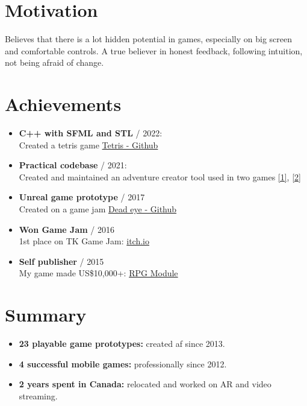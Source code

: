 \documentclass[12pt,a4paper]{article}
\begin{document}
\begin{multicols}{2}
\centering

\section*{ Motivation}
\justifying
Believes that there is a lot hidden potential in games, especially on big screen and comfortable controls. A true believer in honest feedback, following intuition, not being afraid of change.

\centering

\section*{Achievements}
\begin{itemize}[leftmargin=*]
	\setlength\itemsep{0.0cm}
	\item \textbf{C++ with SFML and STL} / 2022: \\
		Created a tetris game {\href{https://github.com/kbobnis/tetris}{Tetris - Github}}
	\item \textbf{Practical codebase} / 2021: \\
		Created and maintained an adventure creator tool used in two games {\href{https://play.google.com/store/apps/details?id=games.dali.adventure.neighborhood.unholy}{[1]}}, {\href{https://play.google.com/store/apps/details?id=games.dali.adventure.reborn}{[2]}}
	\item \textbf{Unreal game prototype} / 2017  \\
		 Created on a game jam  {\href{https://github.com/kbobnis/2017.05-TSG-Compo---Dead-eye}{Dead eye - Github}}
	\item \textbf{Won Game Jam} / 2016   \\
		1st place on TK Game Jam: {\href{https://itch.io/jam/tk-game-jam-2016/results}{itch.io}} 
	\item \textbf{Self publisher} / 2015 \\
		 My game made US\$10,000+: {\href{https://play.google.com/store/apps/details?id=com.wyspianStudios.rpgModuleFull}{RPG Module}} 
\end{itemize}

\section*{Summary}
\begin{itemize}[leftmargin=*]
	\setlength\itemsep{0.0cm}
	\item \textbf{23 playable game prototypes:} created af since 2013.
	\item \textbf{4 successful mobile games:} professionally since 2012.
	\item \textbf{2 years spent in Canada:} relocated and worked on AR and video streaming.
\end{itemize}


\end{multicols}
\end{document}
